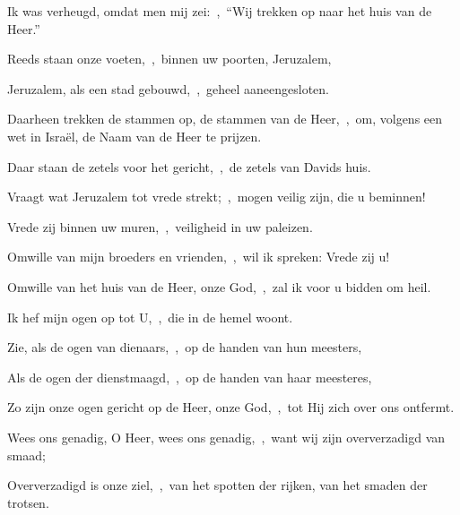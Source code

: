 \documentclass[12pt,twoside,a5paper]{article}
\begin{document}
\begin{halfparskip}
  Ik was verheugd, omdat men mij zei:~\sep\ ``Wij trekken op naar het huis van de Heer.''


  Reeds staan onze voeten,~\sep\ binnen uw poorten, Jeruzalem,

  Jeruzalem, als een stad gebouwd,~\sep\ geheel aaneengesloten.

  Daarheen trekken de stammen op, de stammen van de Heer,~\sep\ om, volgens een wet in Israël, de Naam van de Heer te prijzen.

  Daar staan de zetels voor het gericht,~\sep\ de zetels van Davids huis.

  Vraagt wat Jeruzalem tot vrede strekt;~\sep\ mogen veilig zijn, die u beminnen!

  Vrede zij binnen uw muren,~\sep\ veiligheid in uw paleizen.

  Omwille van mijn broeders en vrienden,~\sep\ wil ik spreken: Vrede zij u!

  Omwille van het huis van de Heer, onze God,~\sep\ zal ik voor u bidden om heil.
\end{halfparskip}


\begin{halfparskip}
  Ik hef mijn ogen op tot U,~\sep\ die in de hemel woont.


  Zie, als de ogen van dienaars,~\sep\ op de handen van hun meesters,

  Als de ogen der dienstmaagd,~\sep\ op de handen van haar meesteres,

  Zo zijn onze ogen gericht op de Heer, onze God,~\sep\ tot Hij zich over ons ontfermt.

  Wees ons genadig, O Heer, wees ons genadig,~\sep\ want wij zijn oververzadigd van smaad;

  Oververzadigd is onze ziel,~\sep\ van het spotten der rijken, van het smaden der trotsen.
\end{halfparskip}

\end{document}
